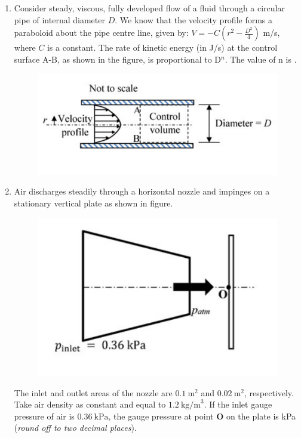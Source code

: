 \documentclass[12pt,onecolumn]{article}
\begin{document}
\begin{enumerate}
    \item Consider steady, viscous, fully developed flow of a fluid through a circular pipe of internal diameter $D$. We know that the velocity profile forms a paraboloid about the pipe centre line, given by: $V=-C\left(r^2-\frac{D^2}{4}\right)$ m/s, where $C$ is a constant. The rate of kinetic energy (in J/s) at the control surface A-B, as shown in the figure, is proportional to D$^n$. The value of n is \underline{\hspace{2cm}}.
          \begin{figure}[H]
              \centering
              \includegraphics[scale=0.5]{q49}
              \label{fig:q49}
          \end{figure}

    \item Air discharges steadily through a horizontal nozzle and impinges on a stationary vertical plate as shown in figure.
          \begin{figure}[H]
              \centering
              \includegraphics[scale=0.5]{q50}
              \label{fig:q50}
          \end{figure}
          The inlet and outlet areas of the nozzle are $0.1~\text{m}^2$ and $0.02~\text{m}^2$, respectively. Take air density as constant and equal to $1.2~\text{kg/m}^3$. If the inlet gauge pressure of air is $0.36~\text{kPa}$, the gauge pressure at point \textbf{O} on the plate is \underline{\hspace{2cm}} kPa (\textit{round off to two decimal places}).


\end{enumerate}
\end{document}
